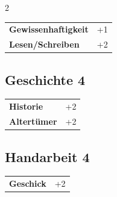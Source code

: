 \begin{multicols}{2}
\begin{tcolorbox}
\begin{tabular}{@{}ll@{}}
    \textbf{Gewissenhaftigkeit} & +1\\
    \textbf{Lesen/Schreiben} & +2\\
\end{tabular}


\end{tcolorbox}

\begin{tcolorbox}
    \subsection*{Geschichte \hfill \small{4 }}
    \tcblower




\begin{tabular}{@{}ll@{}}
    \textbf{Historie} & +2\\
    \textbf{Altertümer} & +2\\
\end{tabular}


\end{tcolorbox}

\begin{tcolorbox}
    \subsection*{Handarbeit \hfill \small{4 }}
    \tcblower




\begin{tabular}{@{}ll@{}}
    \textbf{Geschick} & +2\\
\end{tabular}


\end{tcolorbox}

\begin{tcolorbox}

\end{tcolorbox}
\end{multicols}
